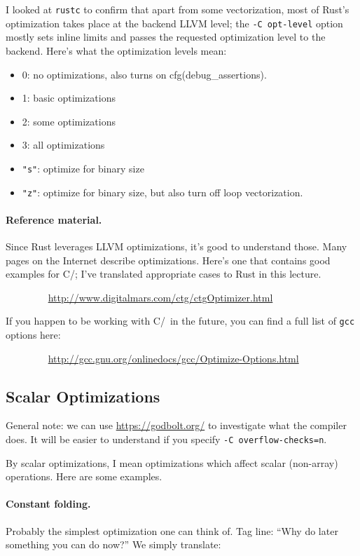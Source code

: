 I looked at \texttt{rustc} to confirm that apart from some vectorization, most of Rust's optimization takes place at the backend LLVM level; the \texttt{-C opt-level} option mostly sets inline limits and passes the requested optimization level to the backend. Here's what the optimization levels mean:

\begin{itemize}[noitemsep]
\item    0: no optimizations, also turns on cfg(debug\_assertions).
\item    1: basic optimizations
\item    2: some optimizations
\item     3: all optimizations
\item    \texttt{"s"}: optimize for binary size
\item    \texttt{"z"}: optimize for binary size, but also turn off loop vectorization.
\end{itemize}

\paragraph{Reference material.} Since Rust leverages LLVM optimizations, it's good to understand those. Many pages on the Internet describe
optimizations. Here's one that contains good examples for C/\CPP; I've translated appropriate cases to Rust in this lecture.

$\qquad \qquad$ \url{http://www.digitalmars.com/ctg/ctgOptimizer.html}

If you happen to be working with C/\CPP~in the future, you can find a full list of {\tt gcc} options here:

$\qquad \qquad$ \url{http://gcc.gnu.org/onlinedocs/gcc/Optimize-Options.html}

\subsection*{Scalar Optimizations}
General note: we can use \url{https://godbolt.org/} to investigate what the compiler does. It will be easier to understand if you specify \texttt{-C overflow-checks=n}.

By scalar optimizations, I mean optimizations
which affect scalar (non-array) operations. Here are some examples.

\paragraph{Constant folding.} Probably the simplest optimization one can think of.
Tag line: ``Why do later something you can do now?'' We simply translate:

